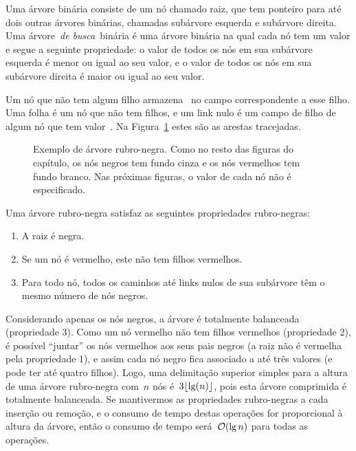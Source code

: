 \documentclass[main.tex]{subfiles}
\begin{document}
Uma árvore binária consiste de um nó chamado raiz, que tem ponteiro para até dois outras árvores binárias, chamadas subárvore esquerda e subárvore direita. Uma árvore~\emph{de busca}~binária é uma árvore binária na qual cada nó tem um valor e segue a seguinte propriedade: o valor de todos os nós em sua subárvore esquerda é menor ou igual ao seu valor, e o valor de todos os nós em sua subárvore direita é maior ou igual ao seu valor.

Um nó que não tem algum filho armazena~ no campo correspondente a esse filho. Uma folha é um nó que não tem filhos, e um link nulo é um campo de filho de algum nó que tem valor~. Na Figura~\ref{fig:arv_bin_ex} estes são as arestas tracejadas.


\begin{figure}
\centering
{}
\caption{Exemplo de árvore rubro-negra. Como no resto das figuras do capítulo, os nós negros tem fundo cinza e os nós vermelhos tem fundo branco. Nas próximas figuras, o valor de cada nó não é especificado.} \label{fig:arv_bin_ex}
\end{figure}

Uma árvore rubro-negra satisfaz as seguintes propriedades rubro-negras:
\begin{enumerate}
\item A raiz é negra.
\item Se um nó é vermelho, este não tem filhos vermelhos.
\item Para todo nó, todos os caminhos até links nulos de sua subárvore têm o mesmo número de nós negros.
\end{enumerate}

Considerando apenas os nós negros, a árvore é totalmente balanceada (propriedade 3). Como um nó vermelho não tem filhos vermelhos (propriedade 2), é possível ``juntar'' os nós vermelhos aos seus pais negros (a raiz não é vermelha pela propriedade 1), e assim cada nó negro fica associado a até três valores (e pode ter até quatro filhos). Logo, uma delimitação superior simples para a altura de uma árvore rubro-negra com~$n$ nós é~$3\lfloor\lg(n)\rfloor$, pois esta árvore comprimida é totalmente balanceada. Se mantivermos as propriedades rubro-negras a cada inserção ou remoção, e o consumo de tempo destas operações for proporcional à altura da árvore, então o consumo de tempo será~$\mathcal{O}(\lg n)$ para todas as operações.
\end{document}
